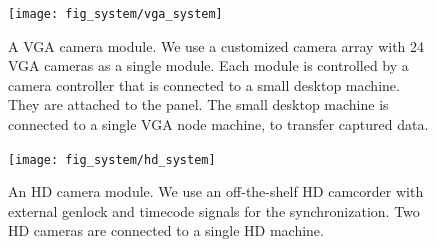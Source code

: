 \begin{figure}
	\centering       
	\texttt{[image: fig\_system/vga\_system]}	
	\caption{A VGA camera module. We use a customized camera array with 24 VGA cameras as a single module. Each module is controlled by a camera controller that is connected to a small desktop machine. They are attached to the panel. The small desktop machine is connected to a single VGA node machine, to transfer captured data.} 
	\label{fig:dome_vgaSystem}
\end{figure}


\begin{figure}
	\centering       
	\texttt{[image: fig\_system/hd\_system]}	
	\caption
	{An HD camera module. We use an off-the-shelf HD camcorder with external genlock and timecode signals for the synchronization. Two HD cameras are connected to a single HD machine.} 
	\label{fig:dome_hdSystem}
\end{figure}

